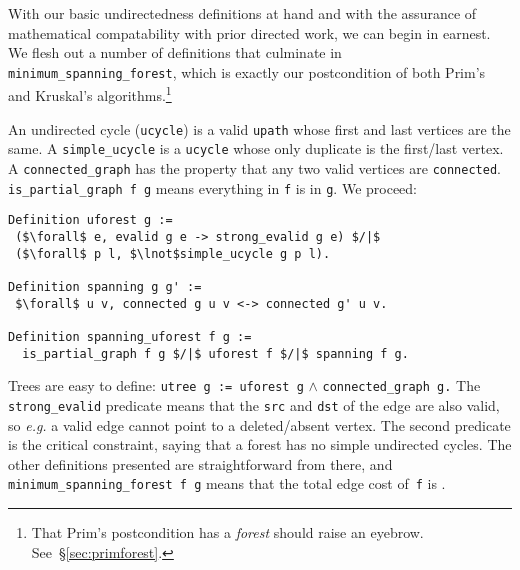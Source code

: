 With our basic undirectedness definitions at hand and with the assurance
of mathematical compatability with prior directed work, we can begin in 
earnest. We flesh out a number of definitions that culminate in 
\texttt{minimum\_spanning\_forest}, which is exactly our postcondition
of both Prim's and Kruskal's algorithms.\footnote{That Prim's postcondition has
a \emph{forest} should raise an eyebrow. See~\S\ref{sec:primforest}.}

An undirected cycle (\texttt{ucycle}) is a valid \texttt{upath} whose first 
and last vertices are the same.  A \texttt{simple\_ucycle} is a \texttt{ucycle} whose
only duplicate is the first/last vertex. A \texttt{connected\_graph}
has the property that any two valid vertices are \texttt{connected}.
\texttt{is\_partial\_graph f g} means everything in \texttt{f} is in \texttt{g}.
We proceed:
\lstset{style=CoqStyle}
\begin{lstlisting}
Definition uforest g := 
 ($\forall$ e, evalid g e -> strong_evalid g e) $/|$
 ($\forall$ p l, $\lnot$simple_ucycle g p l).

Definition spanning g g' := 
 $\forall$ u v, connected g u v <-> connected g' u v.

Definition spanning_uforest f g :=
  is_partial_graph f g $/|$ uforest f $/|$ spanning f g. 
\end{lstlisting}
Trees are easy to define:
\texttt{utree~g~:= uforest~g} $\wedge$ \texttt{connected\_graph~g.}
The \texttt{strong\_evalid} predicate means that the 
\texttt{src} and \texttt{dst} of the edge are also valid, so
\emph{e.g.} a valid edge cannot point to a deleted/absent vertex.
The second predicate is the critical constraint, saying that a
forest has no simple undirected cycles. The other definitions presented
are straightforward from there, and 
\texttt{minimum\_spanning\_forest f g} means that the total edge cost 
of~\texttt{f} is .


